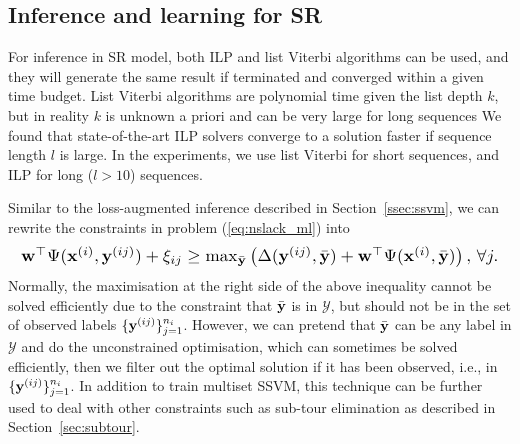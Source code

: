 

\subsection{Inference and learning for SR}
\label{ssec:SRinf}

For inference in SR model, both ILP and list Viterbi algorithms can be used, and they will generate the
same result if terminated and converged within a given time budget.
List Viterbi algorithms are polynomial time given the list depth $k$,
but in reality $k$ is unknown a priori and can be very large for long sequences
We found that state-of-the-art ILP solvers converge to a solution faster if sequence length $l$ is large.
In the experiments, we use list Viterbi for short sequences, and ILP for long ($l>10$) sequences.

Similar to the loss-augmented inference described in Section~\ref{ssec:ssvm},
we can rewrite the constraints in problem (\ref{eq:nslack_ml}) into
\begin{equation*}
\resizebox{0.99\linewidth}{!}
{$
\w^\top \Psi(\x^{(i)}, \y^{(ij)}) + \xi_{ij} \ge
\max_{\bar{\y}} \left( \Delta(\y^{(ij)}, \bar{\y}) + \w^\top \Psi(\x^{(i)}, \bar{\y}) \right),
\, \forall j.
$}
\end{equation*}
Normally, the maximisation at the right side of the above inequality cannot be solved efficiently due to the constraint that
$\bar{\mathbf{y}}$ is in $\mathcal{Y}$,
but should not be in the set of observed labels $\{\mathbf{y}^{(ij)}\}_{j=1}^{n_i}$.
However, we can pretend that $\bar{\mathbf{y}}$ can be any label in $\mathcal{Y}$ and do the unconstrained optimisation,
which can sometimes be solved efficiently, then we filter out the optimal solution if it has been observed,
i.e., in $\{\mathbf{y}^{(ij)}\}_{j=1}^{n_i}$.
In addition to train multiset SSVM, this technique can be further used to deal with other constraints such as sub-tour elimination
as described in Section~\ref{sec:subtour}.

